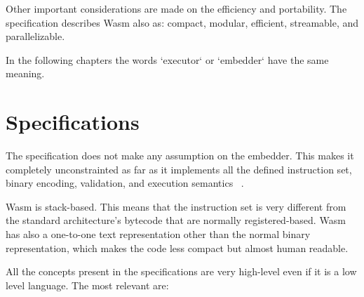 Other important considerations are made on the efficiency and portability. The specification describes Wasm also as: compact, modular, efficient, streamable, and parallelizable.


In the following chapters the words `executor` or `embedder` have the same meaning.

\section{Specifications}

The specification does not make any assumption on the embedder. This makes it completely unconstrainted as far as it implements all the defined instruction set, binary encoding, validation, and execution semantics ~\cite{wasm-core-spec}.

Wasm is stack-based. This means that the instruction set is very different from the standard architecture's bytecode that are normally registered-based. Wasm has also a one-to-one text representation other than the normal binary representation, which makes the code less compact but almost human readable.

All the concepts present in the specifications are very high-level even if it is a low level language. The most relevant are:


